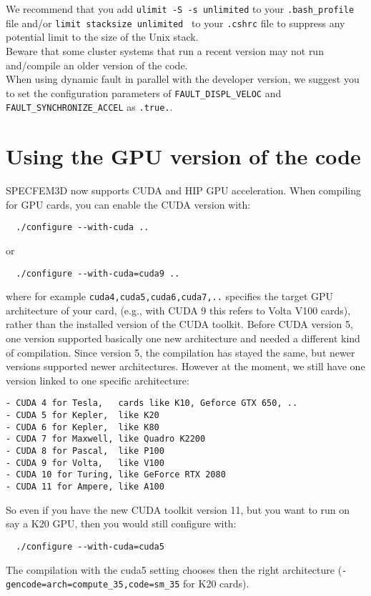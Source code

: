 We recommend that you add {\texttt{ulimit -S -s unlimited}} to your
{\texttt{.bash\_profile}} file and/or {\texttt{limit stacksize
unlimited }} to your {\texttt{.cshrc}} file to suppress any potential
limit to the size of the Unix stack.\\

Beware that some cluster systems that run a recent version may not run and\slash compile an older version of the code. \\

When using dynamic fault in parallel with the developer version, we suggest you to set the configuration parameters
of {\texttt{FAULT_DISPL_VELOC}} and {\texttt{FAULT_SYNCHRONIZE_ACCEL}} as {\texttt{.true.}}.\\

\section{Using the GPU version of the code}

\noindent
SPECFEM3D now supports CUDA and HIP GPU acceleration.
When compiling for GPU cards, you can enable the CUDA version with:
\begin{verbatim}
  ./configure --with-cuda ..
\end{verbatim}
or
\begin{verbatim}
  ./configure --with-cuda=cuda9 ..
\end{verbatim}
where for example \texttt{cuda4,cuda5,cuda6,cuda7,..} specifies the target GPU architecture of your card,
(e.g., with CUDA 9 this refers to Volta V100 cards), rather than the installed version of the CUDA toolkit.
Before CUDA version 5, one version supported basically one new architecture and needed a different kind of compilation.
Since version 5, the compilation has stayed the same, but newer versions supported newer architectures.
However at the moment, we still have one version linked to one specific architecture:
\begin{verbatim}
- CUDA 4 for Tesla,   cards like K10, Geforce GTX 650, ..
- CUDA 5 for Kepler,  like K20
- CUDA 6 for Kepler,  like K80
- CUDA 7 for Maxwell, like Quadro K2200
- CUDA 8 for Pascal,  like P100
- CUDA 9 for Volta,   like V100
- CUDA 10 for Turing, like GeForce RTX 2080
- CUDA 11 for Ampere, like A100
\end{verbatim}
So even if you have the new CUDA toolkit version 11, but you want to run on say a K20 GPU, then you would still configure with:
\begin{verbatim}
  ./configure --with-cuda=cuda5
\end{verbatim}
The compilation with the cuda5 setting chooses then the right architecture (\texttt{-gencode=arch=compute\_35,code=sm\_35} for K20 cards).\\


